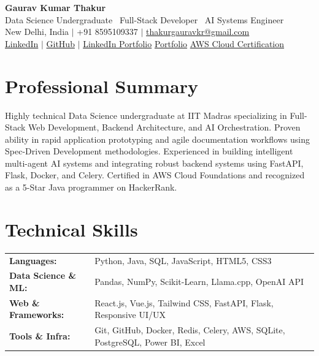\documentclass[10.5pt,a4paper]{article}
\begin{document}
\begin{center}
    {\huge \textbf{Gaurav Kumar Thakur}}\\[2pt]
    {\large Data Science Undergraduate \textbar\ Full-Stack Developer \textbar\ AI Systems Engineer}\\[4pt]
    New Delhi, India \quad $\vert$ \quad
    +91 8595109337 \quad $\vert$ \quad
    \href{mailto:thakurgauravkr@gmail.com}{thakurgauravkr@gmail.com}\\[2pt]
    \href{https://linkedin.com}{LinkedIn} \quad $\vert$ \quad
    \href{https://github.com/grv-galaxy}{GitHub} \quad $\vert$ \quad
    \href{https://www.linkedin.com/in/gaurav-kumar-thakur-2292193a5}{LinkedIn Portfolio} 
    \href{https://gcodes.co.in}{Portfolio}
    \href{https://www.credly.com/users/gaurav-thakur.ba8fd441/badges}{AWS Cloud Certification}
\end{center}

\vspace{2pt}

\section*{Professional Summary}
Highly technical Data Science undergraduate at IIT Madras specializing in Full-Stack Web Development, Backend Architecture, and AI Orchestration. Proven ability in rapid application prototyping and agile documentation workflows using Spec-Driven Development methodologies. Experienced in building intelligent multi-agent AI systems and integrating robust backend systems using FastAPI, Flask, Docker, and Celery. Certified in AWS Cloud Foundations and recognized as a 5-Star Java programmer on HackerRank.

\section*{Technical Skills}
\begin{tabularx}{\textwidth}{@{}l X@{}}
\textbf{Languages:} & Python, Java, SQL, JavaScript, HTML5, CSS3 \\[4pt]
\textbf{Data Science \& ML:} & Pandas, NumPy, Scikit-Learn, Llama.cpp, OpenAI API \\[4pt]
\textbf{Web \& Frameworks:} & React.js, Vue.js, Tailwind CSS, FastAPI, Flask, Responsive UI/UX \\[4pt]
\textbf{Tools \& Infra:} & Git, GitHub, Docker, Redis, Celery, AWS, SQLite, PostgreSQL, Power BI, Excel \\
\end{tabularx}
\end{document}
